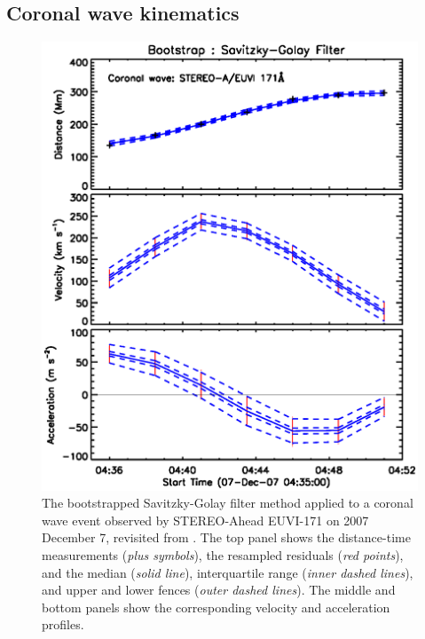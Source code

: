 \documentclass[structabstract]{aa}
\begin{document}
\subsection{Coronal wave kinematics}
\label{subsect:corpita}

\begin{figure}
\centering
\includegraphics[scale=0.6, trim=0 40 0 30]{images/fit_kinscasestudy_wave20071207.eps}
\caption{The bootstrapped Savitzky-Golay filter method applied to a coronal wave event observed by STEREO-Ahead EUVI-171 on 2007 December 7, revisited from \citet{2011A&A...531A..42L}. The top panel shows the distance-time measurements (\emph{plus symbols}), the resampled residuals (\emph{red points}), and the median (\emph{solid line}), interquartile range (\emph{inner dashed lines}), and upper and lower fences (\emph{outer dashed lines}). The middle and bottom panels show the corresponding velocity and acceleration profiles.}
\label{fig_savgol_wave}
\end{figure}
\end{document}

